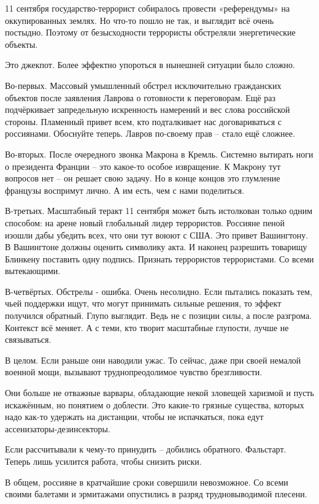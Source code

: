 11 сентября государство-террорист собиралось провести «референдумы» на оккупированных землях. Но что-то пошло не так, и выглядит всё очень постыдно. Поэтому от безысходности террористы обстреляли энергетические объекты. 
 
Это джекпот. Более эффектно упороться в нынешней ситуации было сложно.
 
Во-первых. Массовый умышленный обстрел исключительно гражданских объектов после заявления Лаврова о готовности к переговорам. Ещё раз подчёркивает запредельную искренность намерений и вес слова российской стороны. Пламенный привет всем, кто подталкивает нас договариваться с россиянами. Обоснуйте теперь. Лавров по-своему прав – стало ещё сложнее. 
 
Во-вторых. После очередного звонка Макрона в Кремль. Системно вытирать ноги о президента Франции – это какое-то особое извращение. К Макрону тут вопросов нет – он решает свою задачу. Но в конце концов это глумление французы воспримут лично. А им есть, чем с нами поделиться. 
 
В-третьих. Масштабный теракт 11 сентября может быть истолкован только одним способом: на арене новый глобальный лидер террористов. Россияне пеной изошли дабы убедить всех, что они тут воюют с США. Это привет Вашингтону. В Вашингтоне должны оценить символику акта. И наконец разрешить товарищу Блинкену поставить одну подпись. Признать террористов террористами. Со всеми вытекающими. 
 
В-четвёртых. Обстрелы - ошибка. Очень несолидно. Если пытались показать тем, чьей поддержки ищут, что могут принимать сильные решения, то эффект получился обратный. Глупо выглядит. Ведь не с позиции силы, а после разгрома. Контекст всё меняет. А с теми, кто творит масштабные глупости, лучше не связываться.

В целом. Если раньше они наводили ужас. То сейчас, даже при своей немалой военной мощи, вызывают труднопреодолимое чувство брезгливости. 
 
Они больше не отважные варвары, обладающие некой зловещей харизмой и пусть искажённым, но понятием о доблести. Это какие-то грязные существа, которых надо как-то удержать на дистанции, чтобы не испачкаться, пока едут ассенизаторы-дезинсекторы. 
 
Если рассчитывали к чему-то принудить – добились обратного. Фальстарт. Теперь лишь усилится работа, чтобы снизить риски.
 
В общем, россияне в кратчайшие сроки совершили невозможное. Со всеми своими балетами и эрмитажами опустились в разряд трудновыводимой плесени. 
 
